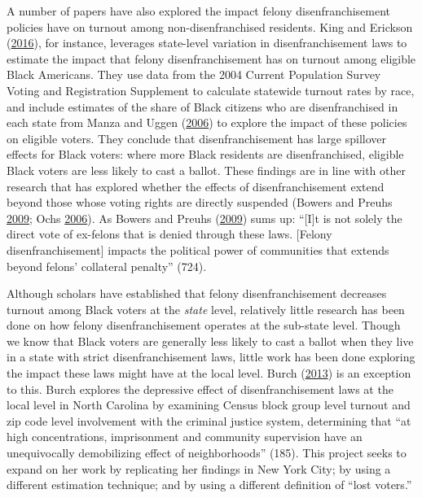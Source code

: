 \documentclass[12pt,]{article}
\begin{document}
A number of papers have also explored the impact felony disenfranchisement policies have on turnout among non-disenfranchised residents. King and Erickson (\protect\hyperlink{ref-King2016}{2016}), for instance, leverages state-level variation in disenfranchisement laws to estimate the impact that felony disenfranchisement has on turnout among eligible Black Americans. They use data from the 2004 Current Population Survey Voting and Registration Supplement to calculate statewide turnout rates by race, and include estimates of the share of Black citizens who are disenfranchised in each state from Manza and Uggen (\protect\hyperlink{ref-locked_out}{2006}) to explore the impact of these policies on eligible voters. They conclude that disenfranchisement has large spillover effects for Black voters: where more Black residents are disenfranchised, eligible Black voters are less likely to cast a ballot. These findings are in line with other research that has explored whether the effects of disenfranchisement extend beyond those whose voting rights are directly suspended (Bowers and Preuhs \protect\hyperlink{ref-Bowers2009}{2009}; Ochs \protect\hyperlink{ref-Ochs2006}{2006}). As Bowers and Preuhs (\protect\hyperlink{ref-Bowers2009}{2009}) sums up: ``{[}I{]}t is not solely the direct vote of ex-felons that is denied through these laws. {[}Felony disenfranchisement{]} impacts the political power of communities that extends beyond felons' collateral penalty'' (724).

Although scholars have established that felony disenfranchisement decreases turnout among Black voters at the \emph{state} level, relatively little research has been done on how felony disenfranchisement operates at the sub-state level. Though we know that Black voters are generally less likely to cast a ballot when they live in a state with strict disenfranchisement laws, little work has been done exploring the impact these laws might have at the local level. Burch (\protect\hyperlink{ref-Burch2013}{2013}) is an exception to this. Burch explores the depressive effect of disenfranchisement laws at the local level in North Carolina by examining Census block group level turnout and zip code level involvement with the criminal justice system, determining that ``at high concentrations, imprisonment and community supervision have an unequivocally demobilizing effect of neighborhoods'' (185). This project seeks to expand on her work by replicating her findings in New York City; by using a different estimation technique; and by using a different definition of ``lost voters.''
\end{document}
